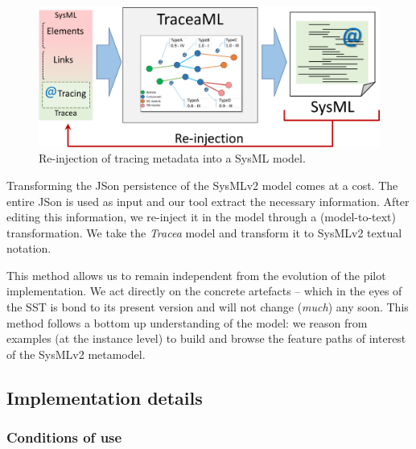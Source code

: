 \begin{figure}[ht]
	\centering
	\includegraphics[width=.7\linewidth]{images/reinject.pdf}
	\caption{Re-injection of tracing metadata into a SysML model.}
	\label{fig:reinject}
\end{figure}

Transforming the JSon persistence of the SysMLv2 model comes at a cost. The entire JSon is used as input and our tool extract the necessary information. After editing this information, we re-inject it in the model through a (model-to-text) transformation. We take the \textit{Tracea} model and transform it to SysMLv2 textual notation. 

This method allows us to remain independent from the evolution of the pilot implementation. We act directly on the concrete artefacts -- which in the eyes of the SST is bond to its present version and will not change (\textit{much}) any soon. This method follows a bottom up understanding of the model: we reason from examples (at the instance level) to build and browse the feature paths of interest of the SysMLv2 metamodel. 

\subsection{Implementation details}

\subsubsection{Conditions of use}

